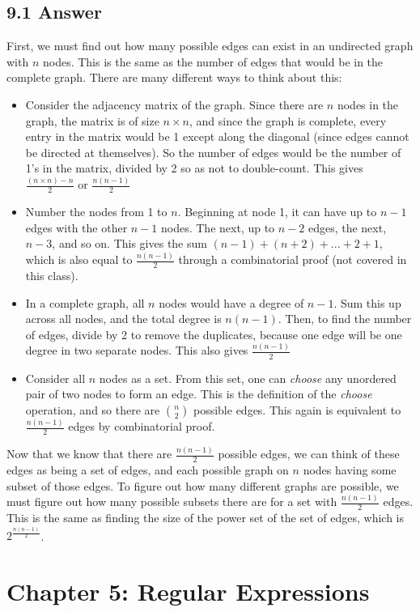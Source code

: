 \documentclass{article}
\begin{document}
\subsection*{9.1 Answer}
First, we must find out how many possible edges can exist in an undirected graph with $n$ nodes. This is the same as the number of edges that would be in the complete graph. There are many different ways to think about this:
\begin{itemize}
    \item Consider the adjacency matrix of the graph. Since there are $n$ nodes in the graph, the matrix is of size $n\times n$, and since the graph is complete, every entry in the matrix would be 1 except along the diagonal (since edges cannot be directed at themselves). So the number of edges would be the number of 1's in the matrix, divided by 2 so as not to double-count. This gives $\frac{(n\times n)-n}{2}$ or $\frac{n(n-1)}{2}$
    \item Number the nodes from 1 to $n$. Beginning at node 1, it can have up to $n-1$ edges with the other $n-1$ nodes. The next, up to $n-2$ edges, the next, $n-3$, and so on. This gives the sum $(n-1)+(n+2)+...+2+1$, which is also equal to $\frac{n(n-1)}{2}$ through a combinatorial proof (not covered in this class).
    \item In a complete graph, all $n$ nodes would have a degree of $n-1$. Sum this up across all nodes, and the total degree is $n(n-1)$. Then, to find the number of edges, divide by 2 to remove the duplicates, because one edge will be one degree in two separate nodes. This also gives $\frac{n(n-1)}{2}$
    \item Consider all $n$ nodes as a set. From this set, one can \textit{choose} any unordered pair of two nodes to form an edge. This is the definition of the \textit{choose} operation, and so there are $n\choose 2$ possible edges. This again is equivalent to $\frac{n(n-1)}{2}$ edges by combinatorial proof.
\end{itemize}
Now that we know that there are $\frac{n(n-1)}{2}$ possible edges, we can think of these edges as being a set of edges, and each possible graph on $n$ nodes having some subset of those edges. To figure out how many different graphs are possible, we must figure out how many possible subsets there are for a set with $\frac{n(n-1)}{2}$ edges. This is the same as finding the size of the power set of the set of edges, which is $2^{\frac{n(n-1)}{2}}$.
\newpage
\section*{Chapter 5: Regular Expressions}
\end{document}
